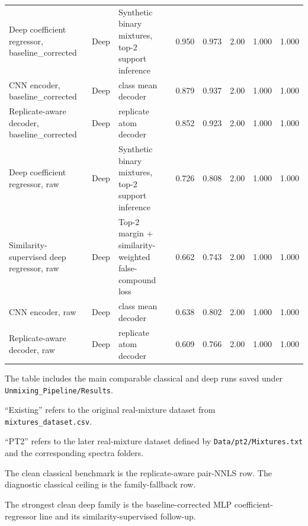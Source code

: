 \documentclass[11pt]{article}
\begin{document}
\begin{table}[ht]
\begin{threeparttable}
{\begin{tabular}{>{\raggedright\arraybackslash}p{3.8cm} >{\raggedright\arraybackslash}p{1.3cm} >{\raggedright\arraybackslash}p{4.4cm} c c c c c}
Deep coefficient regressor, baseline\_corrected & Deep & Synthetic binary mixtures, top-2 support inference & 0.950 & 0.973 & 2.00 & 1.000 & 1.000 \\
CNN encoder, baseline\_corrected & Deep & class mean decoder & 0.879 & 0.937 & 2.00 & 1.000 & 1.000 \\
Replicate-aware decoder, baseline\_corrected & Deep & replicate atom decoder & 0.852 & 0.923 & 2.00 & 1.000 & 1.000 \\
Deep coefficient regressor, raw & Deep & Synthetic binary mixtures, top-2 support inference & 0.726 & 0.808 & 2.00 & 1.000 & 1.000 \\
Similarity-supervised deep regressor, raw & Deep & Top-2 margin + similarity-weighted false-compound loss & 0.662 & 0.743 & 2.00 & 1.000 & 1.000 \\
CNN encoder, raw & Deep & class mean decoder & 0.638 & 0.802 & 2.00 & 1.000 & 1.000 \\
Replicate-aware decoder, raw & Deep & replicate atom decoder & 0.609 & 0.766 & 2.00 & 1.000 & 1.000 \\
\bottomrule
\end{tabular}
}

\begin{tablenotes}\footnotesize
\item The table includes the main comparable classical and deep runs saved under \texttt{Unmixing\_Pipeline/Results}.
\item ``Existing'' refers to the original real-mixture dataset from \texttt{mixtures\_dataset.csv}.
\item ``PT2'' refers to the later real-mixture dataset defined by \texttt{Data/pt2/Mixtures.txt} and the corresponding spectra folders.
\item The clean classical benchmark is the replicate-aware pair-NNLS row. The diagnostic classical ceiling is the family-fallback row.
\item The strongest clean deep family is the baseline-corrected MLP coefficient-regressor line and its similarity-supervised follow-up.
\end{tablenotes}
\end{threeparttable}
\end{table}
\end{document}
